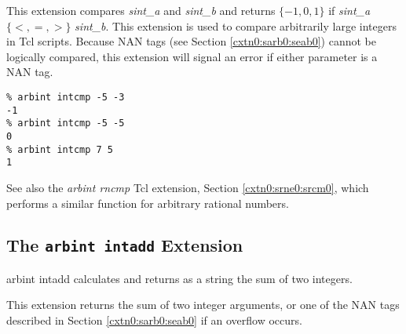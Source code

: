\begin{tclcommanddescription}
This extension compares \emph{sint\_a} and \emph{sint\_b} and
returns $\{-1, 0, 1\}$ if 
\emph{sint\_a} $\{ <, =, > \}$ \emph{sint\_b}.  This extension
is used to compare arbitrarily large integers in Tcl scripts.
Because NAN tags (see Section \ref{cxtn0:sarb0:seab0}) 
cannot be logically compared,
this extension will signal an error if either parameter is 
a NAN tag.
\end{tclcommanddescription}

\begin{tclcommandsampleinvocations}
\begin{scriptsize}
\begin{verbatim}
% arbint intcmp -5 -3
-1
% arbint intcmp -5 -5
0
% arbint intcmp 7 5
1
\end{verbatim}
\end{scriptsize}
\end{tclcommandsampleinvocations}

\begin{tclcommandseealso}
See also the \emph{arbint rncmp} Tcl extension,
Section \ref{cxtn0:srne0:srcm0}, which performs a similar
function for arbitrary rational numbers.
\end{tclcommandseealso}


\subsection{The \texttt{arbint intadd} Extension}
\label{cxtn0:sarb0:sadd0}

\begin{tclcommandname}{arbint intadd}%
calculates and returns as a string the sum of two integers.
\end{tclcommandname}

\begin{tclcommandsynopsis}
\end{tclcommandsynopsis}

\begin{tclcommanddescription}
This extension returns the sum of two integer
arguments, or one of the NAN tags described in
Section \ref{cxtn0:sarb0:seab0} if an overflow occurs.
\end{tclcommanddescription}

